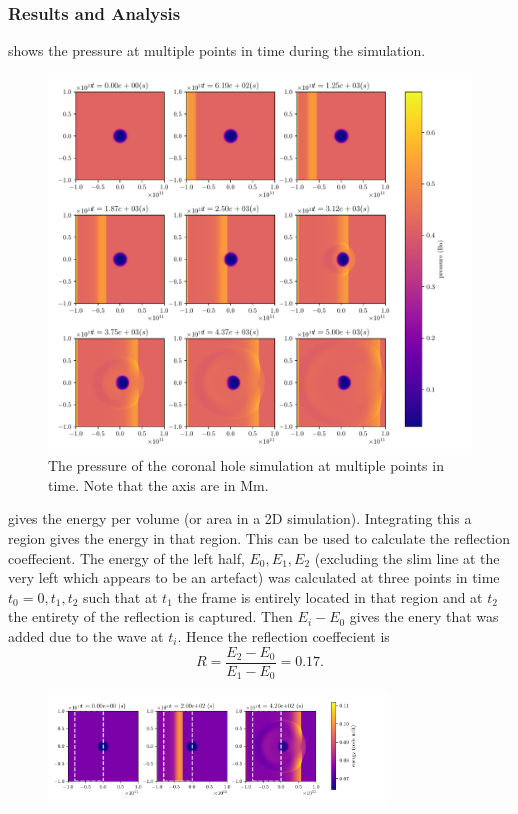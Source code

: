 \documentclass[a4paper]{article}
\numberwithin{figure}{section}
\numberwithin{equation}{section}
\begin{document}
\subsubsection{Results and Analysis} \label{sec:results_and_analysis}
 shows the pressure at multiple points in time during the simulation.
\begin{figure}[h]
	\centering
	\includegraphics[width=1\textwidth]{figures/hole_time.pdf}
	\caption{The pressure of the coronal hole simulation at multiple points in time. Note that the axis are in \si{\mega\metre}.}
	\label{fig:hole}
\end{figure}

 gives the energy per volume (or area in a 2D simulation). 
Integrating this a region gives the energy in that region. 
This can be used to calculate the reflection coeffecient.
The energy of the left half, $E_0, E_1, E_2$ (excluding the slim line at the very left which appears to be an artefact) was calculated at three points in time $t_0 = 0, t_1, t_2$ such that at $t_1$ the frame is entirely located in that region and at $t_2$ the entirety of the reflection is captured. Then $E_i - E_0$ gives the enery that was added due to the wave at $t_i$. Hence the reflection coeffecient is \[
	R = \frac{E_2 - E_0}{E_1 - E_0} = 0.17
.\] 
\begin{figure}[ht]
	\centering
	\includegraphics[width=0.8\textwidth]{figures/calculation_reflection.pdf}
	\caption{}
	\label{fig:}
\end{figure}
\end{document}
